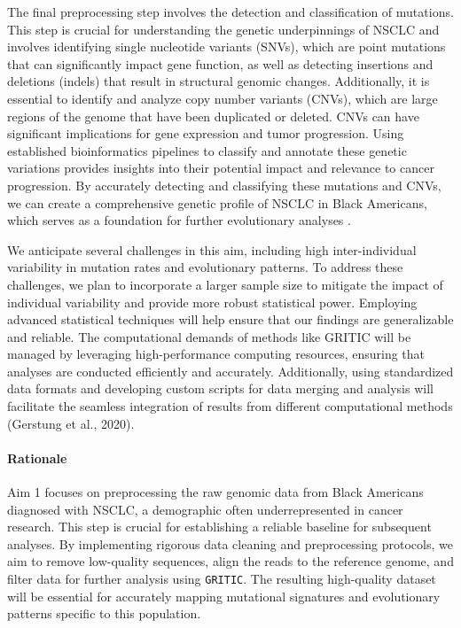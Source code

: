 \vspace{1em}
\noindent
The final preprocessing step involves the detection and classification of mutations. This step is crucial for understanding the genetic underpinnings of NSCLC and involves identifying single nucleotide variants (SNVs), which are point mutations that can significantly impact gene function, as well as detecting insertions and deletions (indels) that result in structural genomic changes. Additionally, it is essential to identify and analyze copy number variants (CNVs), which are large regions of the genome that have been duplicated or deleted. CNVs can have significant implications for gene expression and tumor progression. Using established bioinformatics pipelines to classify and annotate these genetic variations provides insights into their potential impact and relevance to cancer progression. By accurately detecting and classifying these mutations and CNVs, we can create a comprehensive genetic profile of NSCLC in Black Americans, which serves as a foundation for further evolutionary analyses \cite{gerstung_evolutionary_2020}.

\vspace{1em}
\noindent
We anticipate several challenges in this aim, including high inter-individual variability in mutation rates and evolutionary patterns. 
To address these challenges, we plan to incorporate a larger sample size to mitigate the impact of individual variability and provide more robust statistical power. 
Employing advanced statistical techniques will help ensure that our findings are generalizable and reliable. 
The computational demands of methods like GRITIC will be managed by leveraging high-performance computing resources, ensuring that analyses are conducted efficiently and accurately. 
Additionally, using standardized data formats and developing custom scripts for data merging and analysis will facilitate the seamless integration of results from different computational methods (Gerstung et al., 2020).

\paragraph{Rationale}

Aim 1 focuses on preprocessing the raw genomic data from Black Americans diagnosed with NSCLC, 
a demographic often underrepresented in cancer research. 
This step is crucial for establishing a reliable baseline for subsequent analyses. 
By implementing rigorous data cleaning and preprocessing protocols, we aim to remove low-quality sequences, 
align the reads to the reference genome, and filter data for further analysis using \texttt{GRITIC}. 
The resulting high-quality dataset will be essential for accurately mapping mutational signatures and evolutionary patterns specific to this population.

